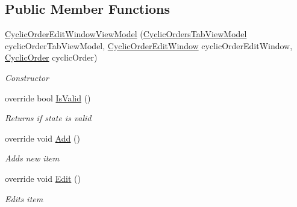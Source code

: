 \subsection*{Public Member Functions}
\begin{DoxyCompactItemize}
\item 
\hyperlink{class_baudi_1_1_client_1_1_view_models_1_1_edit_window_view_models_1_1_cyclic_order_edit_window_view_model_a67db82e915680bebc27c16ddb760d1e1}{Cyclic\+Order\+Edit\+Window\+View\+Model} (\hyperlink{class_baudi_1_1_client_1_1_view_models_1_1_tabs_view_models_1_1_cyclic_orders_tab_view_model}{Cyclic\+Orders\+Tab\+View\+Model} cyclic\+Order\+Tab\+View\+Model, \hyperlink{class_baudi_1_1_client_1_1_view_1_1_edit_windows_1_1_cyclic_order_edit_window}{Cyclic\+Order\+Edit\+Window} cyclic\+Order\+Edit\+Window, \hyperlink{class_baudi_1_1_d_a_l_1_1_models_1_1_cyclic_order}{Cyclic\+Order} cyclic\+Order)
\begin{DoxyCompactList}\small\item\em Constructor \end{DoxyCompactList}\item 
override bool \hyperlink{class_baudi_1_1_client_1_1_view_models_1_1_edit_window_view_models_1_1_cyclic_order_edit_window_view_model_a4ea63b211ca97a8337af850b415f47a4}{Is\+Valid} ()
\begin{DoxyCompactList}\small\item\em Returns if state is valid \end{DoxyCompactList}\item 
override void \hyperlink{class_baudi_1_1_client_1_1_view_models_1_1_edit_window_view_models_1_1_cyclic_order_edit_window_view_model_ac9e3db9fa4f7540f9d271fea888201bc}{Add} ()
\begin{DoxyCompactList}\small\item\em Adds new item \end{DoxyCompactList}\item 
override void \hyperlink{class_baudi_1_1_client_1_1_view_models_1_1_edit_window_view_models_1_1_cyclic_order_edit_window_view_model_af7cf51f90a4fc518df4ecea131138d8d}{Edit} ()
\begin{DoxyCompactList}\small\item\em Edits item \end{DoxyCompactList}\end{DoxyCompactItemize}
